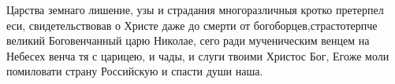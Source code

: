 \mychapterending

\begin{mymulticols}





Царства земнаго лишение, узы и страдания многоразличныя кротко претерпел еси, свидетельствовав о Христе даже до смерти от богоборцев,страстотерпче великий Боговенчанный царю Николае, сего ради мученическим венцем на Небесех венча тя с царицею, и чады, и слуги твоими Христос Бог, Егоже моли помиловати страну Российскую и спасти души наша.

\end{mymulticols}

\mychapterending


